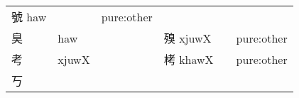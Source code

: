 \documentclass[14pt,a4paper]{scrartcl}
\begin{document}
\begin{longtable}[c]{@{}llllll@{}}
\begin{minipage}[t]{0.14\columnwidth}\raggedright\strut
號 haw
\strut\end{minipage} &
\begin{minipage}[t]{0.14\columnwidth}\raggedright\strut
\strut\end{minipage} &
\begin{minipage}[t]{0.14\columnwidth}\raggedright\strut
pure:other
\strut\end{minipage}\tabularnewline
\begin{minipage}[t]{0.14\columnwidth}\raggedright\strut
臭
\strut\end{minipage} &
\begin{minipage}[t]{0.14\columnwidth}\raggedright\strut
haw
\strut\end{minipage} &
\begin{minipage}[t]{0.14\columnwidth}\raggedright\strut
\strut\end{minipage} &
\begin{minipage}[t]{0.14\columnwidth}\raggedright\strut
殠 xjuwX
\strut\end{minipage} &
\begin{minipage}[t]{0.14\columnwidth}\raggedright\strut
\strut\end{minipage} &
\begin{minipage}[t]{0.14\columnwidth}\raggedright\strut
pure:other
\strut\end{minipage}\tabularnewline
\begin{minipage}[t]{0.14\columnwidth}\raggedright\strut
考
\strut\end{minipage} &
\begin{minipage}[t]{0.14\columnwidth}\raggedright\strut
xjuwX
\strut\end{minipage} &
\begin{minipage}[t]{0.14\columnwidth}\raggedright\strut
\strut\end{minipage} &
\begin{minipage}[t]{0.14\columnwidth}\raggedright\strut
栲 khawX
\strut\end{minipage} &
\begin{minipage}[t]{0.14\columnwidth}\raggedright\strut
\strut\end{minipage} &
\begin{minipage}[t]{0.14\columnwidth}\raggedright\strut
pure:other
\strut\end{minipage}\tabularnewline
\begin{minipage}[t]{0.14\columnwidth}\raggedright\strut
丂
\strut\end{minipage} &

\end{longtable}
\end{document}

